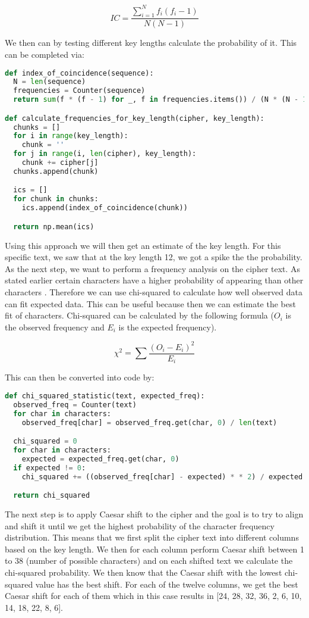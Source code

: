 \documentclass{article}
\begin{document}
\[IC = \frac{\sum_{i=1}^{N} f_i (f_i - 1)}{N (N - 1)}\]

We then can by testing different key lengths calculate the probability of it. This can be completed via:

\begin{lstlisting}[language=Python]
def index_of_coincidence(sequence):
  N = len(sequence)
  frequencies = Counter(sequence)
  return sum(f * (f - 1) for _, f in frequencies.items()) / (N * (N - 1))

def calculate_frequencies_for_key_length(cipher, key_length):
  chunks = []
  for i in range(key_length):
    chunk = ''
  for j in range(i, len(cipher), key_length):
    chunk += cipher[j]
  chunks.append(chunk)

  ics = []
  for chunk in chunks:
    ics.append(index_of_coincidence(chunk))

  return np.mean(ics)
\end{lstlisting}

Using this approach we will then get an estimate of the key length. For this specific text, we saw that at the key length 12, we got a spike the the probability. As the next step, we want to perform a frequency analysis on the cipher text. As stated earlier certain characters have a higher probability of appearing than other characters \cite{christensen2015cryptanalysis}. Therefore we can use chi-squared to calculate how well observed data can fit expected data. This can be useful because then we can estimate the best fit of characters. Chi-squared can be calculated by the following formula (\(O_i\) is the observed frequency and \(E_i\) is the expected frequency).

\[\chi^2 = \sum \frac{(O_i - E_i)^2}{E_i}\]

This can then be converted into code by:

\begin{lstlisting}[language=Python]
def chi_squared_statistic(text, expected_freq):
  observed_freq = Counter(text)
  for char in characters:
    observed_freq[char] = observed_freq.get(char, 0) / len(text)

  chi_squared = 0
  for char in characters:
    expected = expected_freq.get(char, 0)
  if expected != 0:
    chi_squared += ((observed_freq[char] - expected) * * 2) / expected

  return chi_squared
\end{lstlisting}

The next step is to apply Caesar shift \cite{shiftpdf3:online} to the cipher and the goal is to try to align and shift it until we get the highest probability of the character frequency distribution. This means that we first split the cipher text into different columns based on the key length. We then for each column perform Caesar shift between 1 to 38 (number of possible characters) and on each shifted text we calculate the chi-squared probability. We then know that the Caesar shift with the lowest chi-squared value has the best shift. For each of the twelve columns, we get the best Caesar shift for each of them which in this case results in [24, 28, 32, 36, 2, 6, 10, 14, 18, 22, 8, 6]. 
\end{document}
